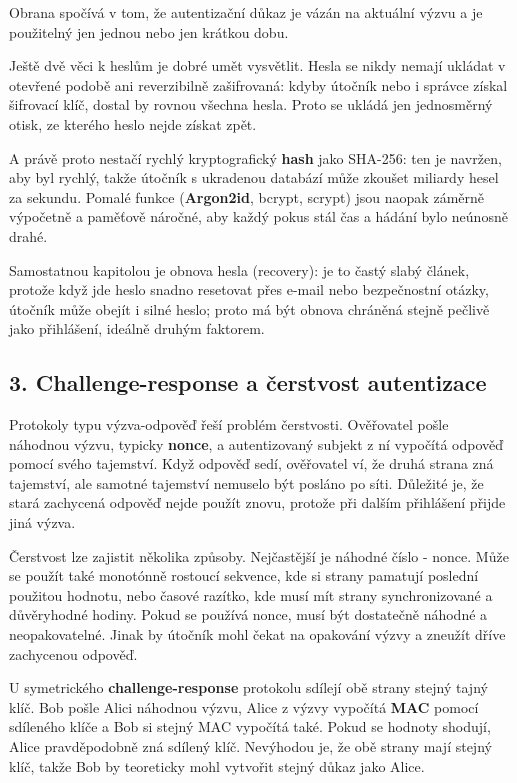 \documentclass[11pt,a4paper]{article}
\begin{document}
Obrana spočívá v tom, že autentizační důkaz je vázán na aktuální výzvu a je použitelný jen jednou nebo jen krátkou dobu.

Ještě dvě věci k heslům je dobré umět vysvětlit. Hesla se nikdy nemají ukládat v otevřené podobě ani reverzibilně zašifrovaná: kdyby útočník nebo i správce získal šifrovací klíč, dostal by rovnou všechna hesla. Proto se ukládá jen jednosměrný otisk, ze kterého heslo nejde získat zpět.

A právě proto nestačí rychlý kryptografický \textbf{hash} jako SHA-256: ten je navržen, aby byl rychlý, takže útočník s ukradenou databází může zkoušet miliardy hesel za sekundu. Pomalé funkce (\textbf{Argon2id}, bcrypt, scrypt) jsou naopak záměrně výpočetně a paměťově náročné, aby každý pokus stál čas a hádání bylo neúnosně drahé.

Samostatnou kapitolou je obnova hesla (recovery): je to častý slabý článek, protože když jde heslo snadno resetovat přes e-mail nebo bezpečnostní otázky, útočník může obejít i silné heslo; proto má být obnova chráněná stejně pečlivě jako přihlášení, ideálně druhým faktorem.

\subsection*{3. Challenge-response a čerstvost autentizace}

Protokoly typu výzva-odpověď řeší problém čerstvosti. Ověřovatel pošle náhodnou výzvu, typicky \textbf{nonce}, a autentizovaný subjekt z ní vypočítá odpověď pomocí svého tajemství. Když odpověď sedí, ověřovatel ví, že druhá strana zná tajemství, ale samotné tajemství nemuselo být posláno po síti. Důležité je, že stará zachycená odpověď nejde použít znovu, protože při dalším přihlášení přijde jiná výzva.

Čerstvost lze zajistit několika způsoby. Nejčastější je náhodné číslo - nonce. Může se použít také monotónně rostoucí sekvence, kde si strany pamatují poslední použitou hodnotu, nebo časové razítko, kde musí mít strany synchronizované a důvěryhodné hodiny. Pokud se používá nonce, musí být dostatečně náhodné a neopakovatelné. Jinak by útočník mohl čekat na opakování výzvy a zneužít dříve zachycenou odpověď.

U symetrického \textbf{challenge-response} protokolu sdílejí obě strany stejný tajný klíč. Bob pošle Alici náhodnou výzvu, Alice z výzvy vypočítá \textbf{MAC} pomocí sdíleného klíče a Bob si stejný MAC vypočítá také. Pokud se hodnoty shodují, Alice pravděpodobně zná sdílený klíč. Nevýhodou je, že obě strany mají stejný klíč, takže Bob by teoreticky mohl vytvořit stejný důkaz jako Alice.
\end{document}
